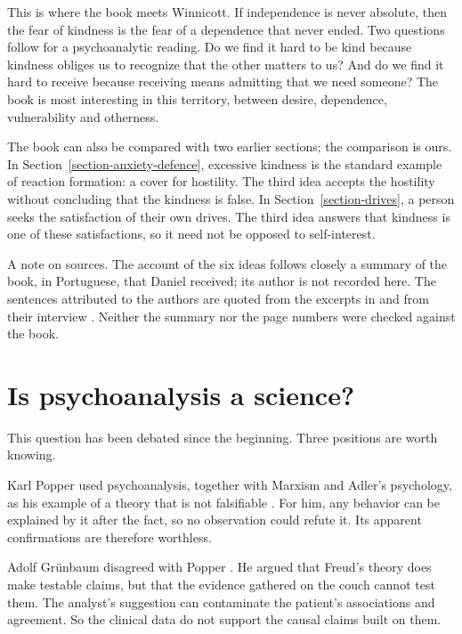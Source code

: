 This is where the book meets Winnicott.
If independence is never absolute, then
the fear of kindness is the fear of a
dependence that never ended. Two
questions follow for a psychoanalytic
reading. Do we find it hard to be kind
because kindness obliges us to recognize
that the other matters to us? And do we
find it hard to receive because
receiving means admitting that we need
someone? The book is most interesting in
this territory, between desire,
dependence, vulnerability and otherness.

The book can also be compared with two
earlier sections; the comparison is
ours. In
Section~\ref{section-anxiety-defence},
excessive kindness is the standard
example of reaction formation: a cover
for hostility. The third idea accepts
the hostility without concluding that
the kindness is false. In
Section~\ref{section-drives}, a person
seeks the satisfaction of their own
drives. The third idea answers that
kindness is one of these satisfactions,
so it need not be opposed to
self-interest.

A note on sources. The account of the
six ideas follows closely a summary of
the book, in Portuguese, that Daniel
received; its author is not recorded
here. The sentences attributed to the
authors are quoted from the excerpts in
\cite{popova-kindness} and from their
interview \cite{smallwood-back-talk}.
Neither the summary nor the page numbers
were checked against the book.

\section{Is psychoanalysis a science?}
\label{section-psychoanalysis-science}

This question has been debated since
the beginning. Three positions are worth
knowing.

Karl Popper used psychoanalysis,
together with Marxism and Adler's
psychology, as his example of a theory
that is not falsifiable
\cite{popper-conjectures}. For him, any
behavior can be explained by it after
the fact, so no observation could
refute it. Its apparent confirmations
are therefore worthless.

Adolf Gr\"unbaum disagreed with Popper
\cite{grunbaum-foundations}. He argued
that Freud's theory does make testable
claims, but that the evidence gathered
on the couch cannot test them. The
analyst's suggestion can contaminate
the patient's associations and
agreement. So the clinical data do not
support the causal claims built on
them.

